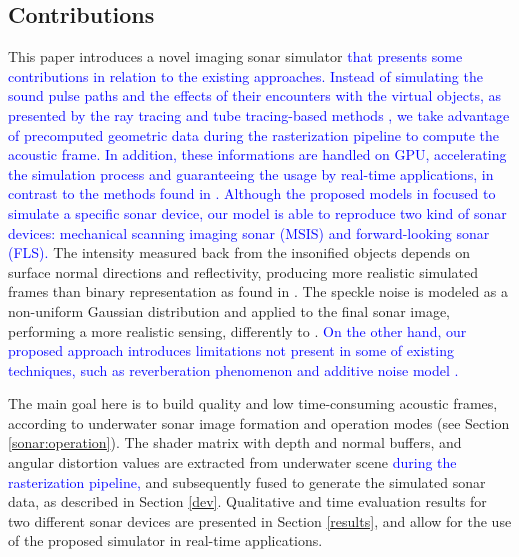 \documentclass[final,5p,times]{elsarticle}
\begin{document}
\subsection{Contributions}

This paper introduces a novel imaging sonar simulator \textcolor{blue}{that presents some
contributions in relation to the existing approaches. Instead of simulating
the sound pulse paths and the effects of their encounters with the virtual
objects, as presented by the ray tracing and tube tracing-based methods
\cite{bell1997,coiras2009,gueriot2010,sac2015,demarco2015,gu2013,kwak2015},
we take advantage of precomputed geometric data during the rasterization
pipeline to compute the acoustic frame. In addition, these informations are
handled on GPU, accelerating the simulation process and guaranteeing the
usage by real-time applications, in contrast to the methods found in
\cite{bell1997,coiras2009,sac2015,demarco2015}. Although the proposed models in
\cite{bell1997,coiras2009,gueriot2010,sac2015,demarco2015,gu2013,kwak2015}
focused to simulate a specific sonar device, our model is able to reproduce
two kind of sonar devices: mechanical scanning imaging sonar (MSIS)
and forward-looking sonar (FLS).} The intensity measured back from the
insonified objects depends on surface normal directions and reflectivity,
producing more realistic simulated frames than binary representation as
found in \cite{gu2013,kwak2015}. The speckle noise is modeled as a non-uniform
Gaussian distribution and applied to the final sonar image, performing a more
realistic sensing, differently to
\cite{gueriot2010,sac2015,demarco2015,gu2013,kwak2015}. \textcolor{blue}{On the other hand,
our proposed approach introduces limitations not present in some of existing
techniques, such as reverberation phenomenon \cite{sac2015} and additive
noise model \cite{sac2015,demarco2015}.}

The main goal here is to build quality and low time\hyp{}consuming acoustic
frames, according to underwater sonar image formation and operation modes
(see Section \ref{sonar:operation}). The shader matrix with depth and normal
buffers, and angular distortion values are extracted from underwater scene
\textcolor{blue}{during the rasterization pipeline,} and subsequently fused to generate the
simulated sonar data, as described in Section \ref{dev}. Qualitative and
time evaluation results for two different sonar devices are presented in
Section \ref{results}, and allow for the use of the proposed simulator in
real-time applications.
\end{document}
